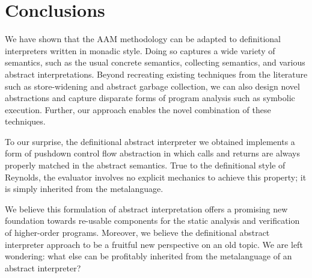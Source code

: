 \section{Conclusions}\label{s:conclusion}

We have shown that the AAM methodology can be adapted to definitional
interpreters written in monadic style.  Doing so captures a wide
variety of semantics, such as the usual concrete semantics, collecting
semantics, and various abstract interpretations.  Beyond recreating
existing techniques from the literature such as store-widening and
abstract garbage collection, we can also design novel abstractions and
capture disparate forms of program analysis such as symbolic
execution.  Further, our approach enables the novel combination of
these techniques.

To our surprise, the definitional abstract interpreter we obtained
implements a form of pushdown control flow abstraction in which calls
and returns are always properly matched in the abstract semantics.
True to the definitional style of Reynolds, the evaluator involves no
explicit mechanics to achieve this property; it is simply inherited
from the metalanguage.

We believe this formulation of abstract interpretation offers a
promising new foundation towards re-usable components for the static
analysis and verification of higher-order programs.  Moreover, we
believe the definitional abstract interpreter approach to be a
fruitful new perspective on an old topic.  We are left wondering: what
else can be profitably inherited from the metalanguage of an abstract
interpreter?
